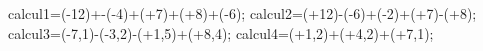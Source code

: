 \documentclass[exercice]{thedocument}%
\begin{document}
%
\>calcul1=(-12)+-(-4)+(+7)+(+8)+(-6);%
\>calcul2=(+12)-(-6)+(-2)+(+7)-(+8);%
\>calcul3=(-7,1)-(-3,2)-(+1,5)+(+8,4);%
\>calcul4=(+1,2)+(+4,2)+(+7,1);%
%
\end{document}
